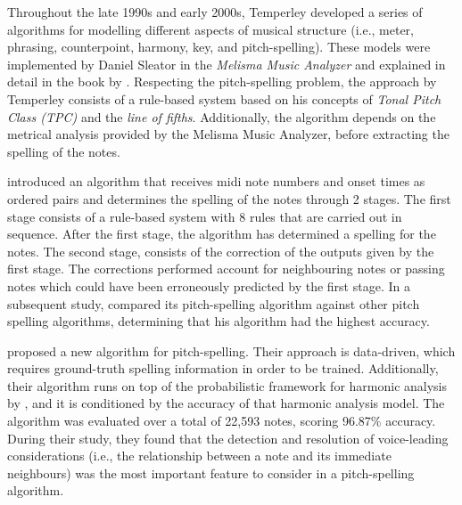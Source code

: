 Throughout the late 1990s and early 2000s, Temperley
developed a series of algorithms for modelling different
aspects of musical structure (i.e., meter, phrasing,
counterpoint, harmony, key, and pitch-spelling). These
models were implemented by Daniel Sleator in the
\emph{Melisma Music Analyzer} and explained in detail in the
book by \textcite{temperley2004cognition}. Respecting the
pitch-spelling problem, the approach by Temperley consists
of a rule-based system based on his concepts of \emph{Tonal
Pitch Class (TPC)} and the \emph{line of fifths}.
Additionally, the algorithm depends on the metrical analysis
provided by the Melisma Music Analyzer, before extracting
the spelling of the notes.

\textcite{meredith2003pitch} introduced an algorithm that
receives \gls{midi} note numbers and onset times as ordered pairs
and determines the spelling of the notes through 2 stages.
The first stage consists of a rule-based system with 8 rules
that are carried out in sequence. After the first stage, the
algorithm has determined a spelling for the notes. The
second stage, consists of the correction of the outputs
given by the first stage. The corrections performed account
for neighbouring notes or passing notes which could have
been erroneously predicted by the first stage. In a
subsequent study, \textcite{meredith2005comparing} compared
its pitch-spelling algorithm against other pitch spelling
algorithms, determining that his algorithm had the highest
accuracy.

\textcite{stoddard2004welltempered} proposed a new algorithm
for pitch-spelling. Their approach is data-driven, which
requires ground-truth spelling information in order to be
trained. Additionally, their algorithm runs on top of the
probabilistic framework for harmonic analysis by
\textcite{raphael2003harmonic}, and it is conditioned by the
accuracy of that harmonic analysis model. The algorithm was
evaluated over a total of 22,593 notes, scoring 96.87\%
accuracy. During their study, they found that the detection
and resolution of voice-leading considerations (i.e., the
relationship between a note and its immediate neighbours)
was the most important feature to consider in a
pitch-spelling algorithm.

